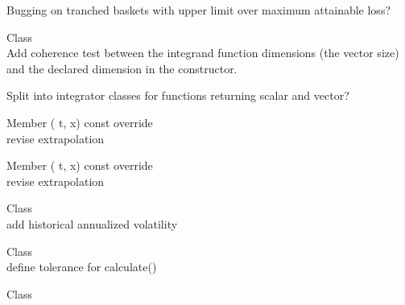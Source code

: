 \begin{DoxyRefList}
\label{todo__todo000014}%
%
Bugging on tranched baskets with upper limit over maximum attainable loss?  
\item[Class \doxylink{class_quant_lib_1_1_gaussian_quad_multidim_integrator}{Quant\+Lib\+::Gaussian\+Quad\+Multidim\+Integrator} ]\hfill \\
\label{todo__todo000029}%
%
Add coherence test between the integrand function dimensions (the vector size) and the declared dimension in the constructor.

\label{todo__todo000030}%
%
Split into integrator classes for functions returning scalar and vector?  
\item[Member \doxylink{class_quant_lib_1_1_generalized_black_scholes_process_a72dbcf1a1c410debf2b0b1d07124a3bf}{Quant\+Lib\+::Generalized\+Black\+Scholes\+Process\+::diffusion} (\doxylink{namespace_quant_lib_a4f78b18a4dd1a979eb78b4e1e8ac1503}{Time} t, \doxylink{namespace_quant_lib_a372ac5c1a422a6b276fe0552d4d83f50}{Real} x) const override]\hfill \\
\label{todo__todo000069}%
%
revise extrapolation  
\item[Member \doxylink{class_quant_lib_1_1_generalized_black_scholes_process_abf46d8ac312c489f2fcf00fefc734953}{Quant\+Lib\+::Generalized\+Black\+Scholes\+Process\+::drift} (\doxylink{namespace_quant_lib_a4f78b18a4dd1a979eb78b4e1e8ac1503}{Time} t, \doxylink{namespace_quant_lib_a372ac5c1a422a6b276fe0552d4d83f50}{Real} x) const override]\hfill \\
\label{todo__todo000068}%
%
revise extrapolation  
\item[Class \doxylink{class_quant_lib_1_1_generic_risk_statistics}{Quant\+Lib\+::Generic\+Risk\+Statistics\texorpdfstring{$<$}{<} S \texorpdfstring{$>$}{>}} ]\hfill \\
\label{todo__todo000052}%
%
add historical annualized volatility 
\item[Class \doxylink{class_quant_lib_1_1_integral_engine}{Quant\+Lib\+::Integral\+Engine} ]\hfill \\
\label{todo__todo000067}%
%
define tolerance for calculate() 
\item[Class \doxylink{class_quant_lib_1_1_interest_rate_index}{Quant\+Lib\+::Interest\+Rate\+Index} ]\hfill \\
\label{todo__todo000035}%
%

\end{DoxyRefList}
